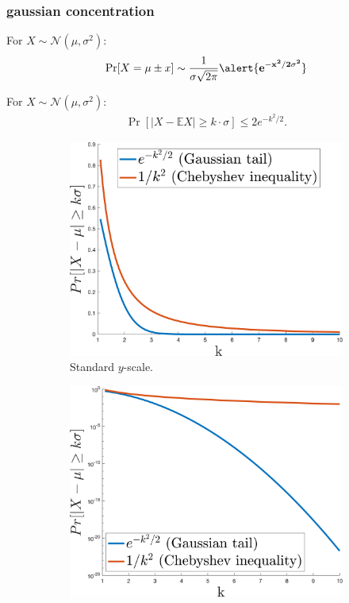 \documentclass[compress]{beamer}
\newcommand{\E}{\mathbb{E}}
\begin{document}
\begin{frame}
	\frametitle{gaussian concentration}
	\small
	For $X \sim \mathcal{N}(\mu,\sigma^2)$:
	\begin{align*}
		\Pr[X = \mu \pm x] \sim \frac{1}{\sigma\sqrt{2\pi}} \alert{\mathbf{e^{-x^2/2\sigma^2}}}
	\end{align*}
	\vspace{-1em}
	\begin{lemma}
		For $X \sim \mathcal{N}(\mu,\sigma^2)$:\vspace{-.5em}
		\begin{align*}
			\Pr[|X - \E X| \geq k\cdot\sigma] \leq 2e^{-k^2/2}.
		\end{align*}
	\end{lemma}
	\begin{figure}
		\begin{subfigure}[t]{0.45\textwidth}
			\centering
			\includegraphics[width=\textwidth]{standardScale.png}
			\caption{Standard $y$-scale.}
		\end{subfigure}
		\hspace{1em}
		\begin{subfigure}[t]{0.45\textwidth}
			\centering
			\includegraphics[width=\textwidth]{logScale.png}

\end{subfigure}
\end{figure}
\end{frame}
\end{document}
